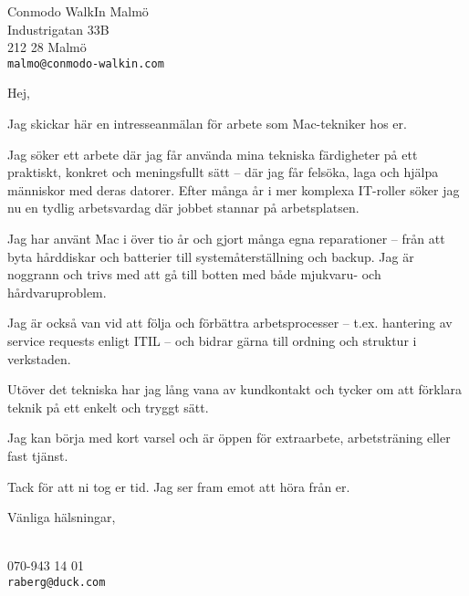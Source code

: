 \documentclass[a4paper]{scrlttr2}
\begin{document}
\begin{letter}{Conmodo WalkIn Malmö\\Industrigatan 33B\\212 28 Malmö\\\texttt{malmo@conmodo-walkin.com}}

\opening{Hej,}

Jag skickar här en intresseanmälan för arbete som Mac-tekniker hos er.

Jag söker ett arbete där jag får använda mina tekniska färdigheter på ett praktiskt, konkret och meningsfullt sätt – där jag får felsöka, laga och hjälpa människor med deras datorer. Efter många år i mer komplexa IT-roller söker jag nu en tydlig arbetsvardag där jobbet stannar på arbetsplatsen.

Jag har använt Mac i över tio år och gjort många egna reparationer – från att byta hårddiskar och batterier till systemåterställning och backup. Jag är noggrann och trivs med att gå till botten med både mjukvaru- och hårdvaruproblem.

Jag är också van vid att följa och förbättra arbetsprocesser – t.ex. hantering av service requests enligt ITIL – och bidrar gärna till ordning och struktur i verkstaden.

Utöver det tekniska har jag lång vana av kundkontakt och tycker om att förklara teknik på ett enkelt och tryggt sätt.

Jag kan börja med kort varsel och är öppen för extraarbete, arbetsträning eller fast tjänst.

Tack för att ni tog er tid. Jag ser fram emot att höra från er.

\closing{Vänliga hälsningar,}\\[1em]
070-943 14 01\\
\texttt{raberg@duck.com}

\end{letter}
\end{document}
